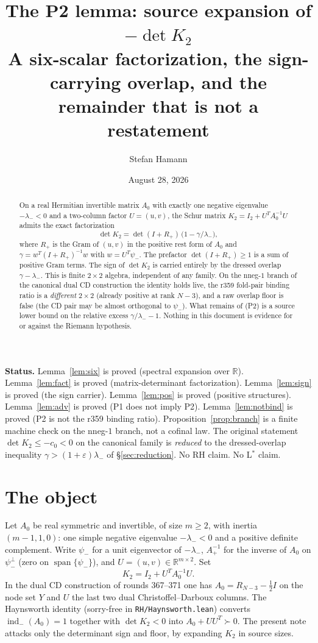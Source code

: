 \documentclass[11pt]{article}
\title{\bfseries The P2 lemma: source expansion of $-\det K_{2}$\\[2mm]
\large A six-scalar factorization, the sign-carrying overlap,
and the remainder that is not a restatement}
\author{Stefan Hamann}
\date{August 28, 2026}
\theoremstyle{remark}
\newcommand{\half}{\tfrac12}
\newcommand{\R}{\mathbb{R}}
\newcommand{\lam}{\lambda_{-}}
\newcommand{\psim}{\psi_{-}}
\newcommand{\Rp}{R_{+}}
\newcommand{\Ap}{A_{+}}
\begin{document}
\maketitle

\begin{abstract}\noindent
On a real Hermitian invertible matrix $A_{0}$ with exactly one
negative eigenvalue $-\lam<0$ and a two-column factor $U=(u,v)$,
the Schur matrix $K_{2}=I_{2}+U^{T}A_{0}^{-1}U$ admits the exact
factorization
\[
\det K_{2}
=\det(I+\Rp)\,
\bigl(1-\gamma/\lam\bigr),
\]
where $\Rp$ is the Gram of $(u,v)$ in the positive rest form of
$A_{0}$ and $\gamma=w^{T}(I+\Rp)^{-1}w$ with $w=U^{T}\psim$.
The prefactor $\det(I+\Rp)\ge 1$ is a sum of positive Gram
terms.  The sign of $\det K_{2}$ is carried entirely by the
dressed overlap $\gamma-\lam$.  This is finite $2\times2$
algebra, independent of any family.  On the nneg-$1$ branch of
the canonical dual CD construction the identity holds live, the
r359 fold-pair binding ratio is a \emph{different} $2\times2$
(already positive at rank $N-3$), and a raw overlap floor is
false (the CD pair may be almost orthogonal to $\psim$).  What
remains of (P2) is a source lower bound on the relative excess
$\gamma/\lam-1$.  Nothing in this document is evidence for or
against the Riemann hypothesis.
\end{abstract}

\medskip\noindent
\textbf{Status.}\enspace
Lemma~\ref{lem:six} is proved (spectral expansion over $\R$).
Lemma~\ref{lem:fact} is proved (matrix-determinant factorization).
Lemma~\ref{lem:sign} is proved (the sign carrier).
Lemma~\ref{lem:pos} is proved (positive structures).
Lemma~\ref{lem:adv} is proved (P1 does not imply P2).
Lemma~\ref{lem:notbind} is proved (P2 is not the r359 binding
ratio).
Proposition~\ref{prop:branch} is a finite machine check on the
nneg-$1$ branch, not a cofinal law.
The original statement $\det K_{2}\le -c_{0}<0$ on the canonical
family is \emph{reduced} to the dressed-overlap inequality
$\gamma>(1+\varepsilon)\lam$ of \S\ref{sec:reduction}.
No RH claim.  No L$^{*}$ claim.

\section{The object}\label{sec:obj}

Let $A_{0}$ be real symmetric and invertible, of size $m\ge 2$,
with inertia $(m-1,1,0)$: one simple negative eigenvalue
$-\lam<0$ and a positive definite complement.  Write $\psim$ for
a unit eigenvector of $-\lam$, $\Ap^{-1}$ for the inverse of
$A_{0}$ on $\psim^{\perp}$ (zero on $\operatorname{span}\{\psim\}$),
and $U=(u,v)\in\R^{m\times 2}$.  Set
\[
K_{2}=I_{2}+U^{T}A_{0}^{-1}U.
\]
In the dual CD construction of rounds 367--371 one has
$A_{0}=R_{N-3}-\half I$ on the node set $Y$ and $U$ the last two
dual Christoffel--Darboux columns.  The Haynsworth identity
(sorry-free in \texttt{RH/Haynsworth.lean}) converts
$\operatorname{ind}_{-}(A_{0})=1$ together with $\det K_{2}<0$
into $A_{0}+UU^{T}\succ 0$.  The present note attacks only the
determinant sign and floor, by expanding $K_{2}$ in source sizes.
\end{document}
